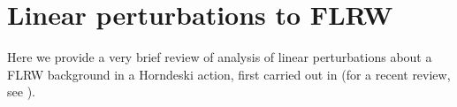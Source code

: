 \documentclass[amsmath,amssymb,11pt]{article}
\begin{document}

\section{Linear perturbations to FLRW} \label{app:linperts}


 Here we provide a very brief review of analysis of linear perturbations about a FLRW background in a Horndeski action, first carried out in \cite{DeFelice:2011bh} (for a recent review, see \cite{Kobayashi:2019hrl}).
\end{document}
